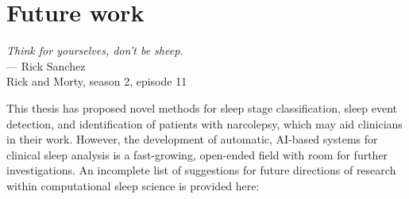 \chapter{Future work}\label{chap:future-work}

\begin{flushright}{\slshape 
        Think for yourselves, don't be sheep.} \\ \medskip
        --- Rick Sanchez\\Rick and Morty, season 2, episode 11
\end{flushright}

\vspace{6cm}

This thesis has proposed novel methods for sleep stage classification, sleep event detection, and identification of patients with narcolepsy, which may aid clinicians in their work.
However, the development of automatic, \ac{AI}-based systems for clinical sleep analysis is a fast-growing, open-ended field with room for further investigations.
An incomplete list of suggestions for future directions of research within computational sleep science is provided here:


